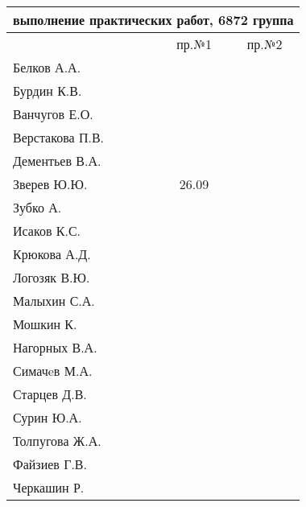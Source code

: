 \documentclass[a4paper,11pt]{article}
\begin{document}
\newpage
\begin{tabular}{l|cc}
\multicolumn{3}{c}{выполнение практических работ, 6872 группа} \\
\toprule
& пр.№1 & пр.№2 \\
\midrule
Белков А.А.    &     &     \\   
Бурдин К.В.    &     &     \\
Ванчугов Е.О.  &     &     \\
Верстакова П.В.&     &     \\
Дементьев В.А. &     &     \\
Зверев Ю.Ю.    &26.09&     \\
Зубко А.       &     &     \\
Исаков К.С.    &     &     \\
Крюкова А.Д.   &     &     \\
Логозяк В.Ю.   &     &     \\
Малыхин С.А.   &     &     \\
Мошкин К.      &     &     \\
Нагорных В.А.  &     &     \\
Симачeв М.А.   &     &     \\
Старцев Д.В.   &     &     \\
Сурин Ю.А.     &     &     \\
Толпугова Ж.А. &     &     \\
Файзиев Г.В.   &     &     \\
Черкашин Р.    &     &     \\
\bottomrule
\end{tabular}
\end{document}
